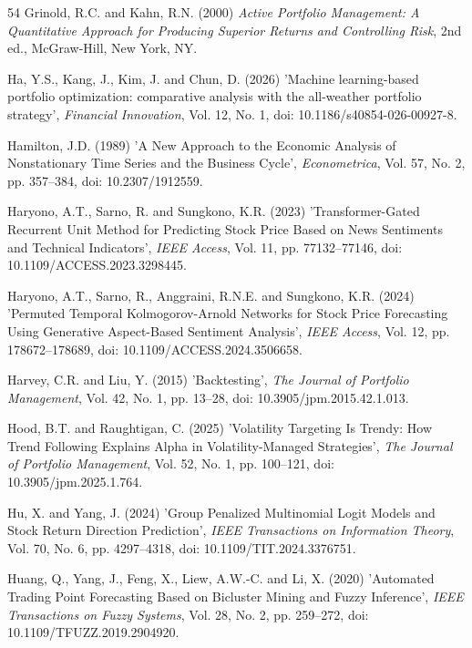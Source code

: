 \documentclass{singlecol-new}
\theoremstyle{TH}{
\newtheorem{lemma}{Lemma}
\newtheorem{theorem}[lemma]{Theorem}
\newtheorem{corrolary}[lemma]{Corrolary}
\newtheorem{conjecture}[lemma]{Conjecture}
\newtheorem{proposition}[lemma]{Proposition}
\newtheorem{claim}[lemma]{Claim}
\newtheorem{stheorem}[lemma]{Wrong Theorem}
\newtheorem{algorithm}{Algorithm}
}
\theoremstyle{THrm}{
\newtheorem{definition}{Definition}[section]
\newtheorem{question}{Question}[section]
\newtheorem{remark}{Remark}
\newtheorem{scheme}{Scheme}
}
\theoremstyle{THhit}{
\newtheorem{case}{Case}[section]
}
\begin{document}
\begin{thebibliography}{54}
Grinold, R.C. and Kahn, R.N. (2000) {\it Active Portfolio Management: A Quantitative Approach for Producing Superior Returns and Controlling Risk}, 2nd ed., McGraw-Hill, New York, NY.

Ha, Y.S., Kang, J., Kim, J. and Chun, D. (2026) 'Machine learning-based portfolio optimization: comparative analysis with the all-weather portfolio strategy', {\it Financial Innovation}, Vol. 12, No. 1, doi: 10.1186/s40854-026-00927-8.

Hamilton, J.D. (1989) 'A New Approach to the Economic Analysis of Nonstationary Time Series and the Business Cycle', {\it Econometrica}, Vol. 57, No. 2, pp. 357--384, doi: 10.2307/1912559.

Haryono, A.T., Sarno, R. and Sungkono, K.R. (2023) 'Transformer-Gated Recurrent Unit Method for Predicting Stock Price Based on News Sentiments and Technical Indicators', {\it IEEE Access}, Vol. 11, pp. 77132--77146, doi: 10.1109/ACCESS.2023.3298445.

Haryono, A.T., Sarno, R., Anggraini, R.N.E. and Sungkono, K.R. (2024) 'Permuted Temporal Kolmogorov-Arnold Networks for Stock Price Forecasting Using Generative Aspect-Based Sentiment Analysis', {\it IEEE Access}, Vol. 12, pp. 178672--178689, doi: 10.1109/ACCESS.2024.3506658.

Harvey, C.R. and Liu, Y. (2015) 'Backtesting', {\it The Journal of Portfolio Management}, Vol. 42, No. 1, pp. 13--28, doi: 10.3905/jpm.2015.42.1.013.

Hood, B.T. and Raughtigan, C. (2025) 'Volatility Targeting Is Trendy: How Trend Following Explains Alpha in Volatility-Managed Strategies', {\it The Journal of Portfolio Management}, Vol. 52, No. 1, pp. 100--121, doi: 10.3905/jpm.2025.1.764.

Hu, X. and Yang, J. (2024) 'Group Penalized Multinomial Logit Models and Stock Return Direction Prediction', {\it IEEE Transactions on Information Theory}, Vol. 70, No. 6, pp. 4297--4318, doi: 10.1109/TIT.2024.3376751.

Huang, Q., Yang, J., Feng, X., Liew, A.W.-C. and Li, X. (2020) 'Automated Trading Point Forecasting Based on Bicluster Mining and Fuzzy Inference', {\it IEEE Transactions on Fuzzy Systems}, Vol. 28, No. 2, pp. 259--272, doi: 10.1109/TFUZZ.2019.2904920.


\end{thebibliography}
\end{document}
